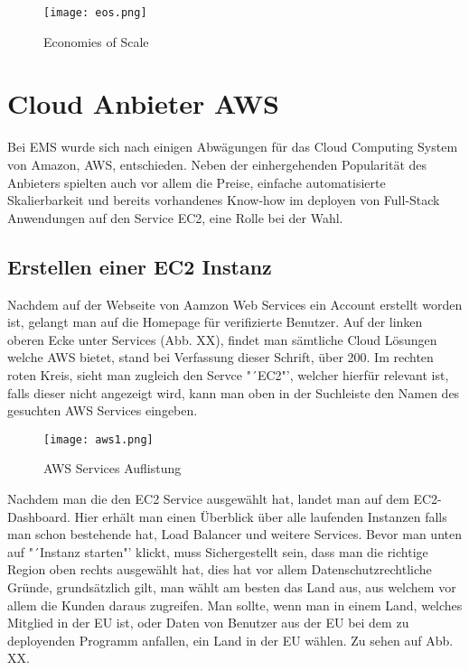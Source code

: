 \begin{center}
\begin{figure}[h]
    \centering
    \texttt{[image: eos.png]}
    \caption{Economies of Scale}
\end{figure}
\end{center}
\break
\section{Cloud Anbieter AWS}
Bei EMS wurde sich nach einigen Abwägungen für das Cloud Computing System von Amazon, AWS, entschieden. Neben der einhergehenden Popularität des Anbieters spielten auch vor allem die Preise, einfache automatisierte Skalierbarkeit und bereits vorhandenes Know-how im deployen von Full-Stack Anwendungen auf den Service EC2, eine Rolle bei der Wahl.

\subsection{Erstellen einer EC2 Instanz}
Nachdem auf der Webseite von Aamzon Web Services ein Account erstellt worden ist, gelangt man auf die Homepage für verifizierte Benutzer. Auf der linken oberen Ecke unter Services (Abb. XX), findet man sämtliche Cloud Lösungen welche AWS bietet, stand bei Verfassung dieser Schrift, über 200. Im rechten roten Kreis, sieht man zugleich den Servce "´EC2"', welcher hierfür relevant ist, falls dieser nicht angezeigt wird, kann man oben in der Suchleiste den Namen des gesuchten AWS Services eingeben.

\begin{center}
\begin{figure}[h]
    \centering
    \texttt{[image: aws1.png]}
    \caption{AWS Services Auflistung}
\end{figure}
\end{center}

Nachdem man die den EC2 Service ausgewählt hat, landet man auf dem EC2-Dashboard. Hier erhält man einen Überblick über alle laufenden Instanzen falls man schon bestehende hat, Load Balancer und weitere Services. Bevor man unten auf "´Instanz starten"' klickt, muss Sichergestellt sein, dass man die richtige Region oben rechts ausgewählt hat, dies hat vor allem Datenschutzrechtliche Gründe, grundsätzlich gilt, man wählt am besten das Land aus, aus welchem vor allem die Kunden daraus zugreifen. Man sollte, wenn man in einem Land, welches Mitglied in der EU ist, oder Daten von Benutzer aus der EU bei dem zu deployenden Programm anfallen, ein Land in der EU wählen. Zu sehen auf Abb. XX.

